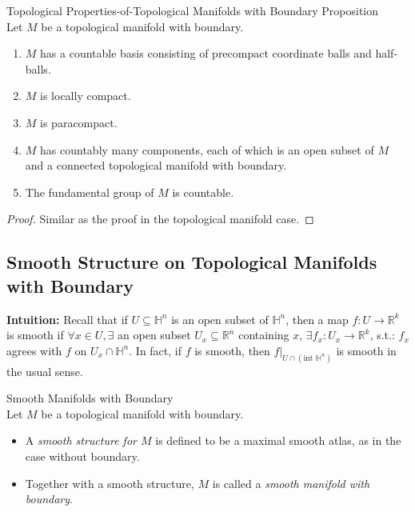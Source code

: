 \begin{proposition}{Topological Properties-of-Topological Manifolds with Boundary Proposition}\\
Let $M$ be a topological manifold with boundary.
\begin{enumerate}
    \item $M$ has a countable basis consisting of precompact coordinate balls and half-balls.
    \item $M$ is locally compact.
    \item $M$ is paracompact.
    \item $M$ has countably many components, each of which is an open subset of $M$ and a connected topological manifold with boundary.
    \item The fundamental group of $M$ is countable.
\end{enumerate}
\end{proposition}

\begin{proof}
    Similar as the proof in the topological manifold case.
\end{proof}

\subsection{Smooth Structure on Topological Manifolds with Boundary}

\noindent\textbf{Intuition:} Recall that if $U \subseteq \mathbb{H}^n$ is an open subset of $\mathbb{H}^n$, then a map $f:U \to \mathbb{R}^k$ is smooth if $\forall x\in U, \exists$ an open subset $U_x \subseteq \mathbb{R}^n$ containing $x$, $\exists f_x :U_x\to \mathbb{R}^k$, s.t.: $f_x$ agrees with $f$ on $U_x \cap \mathbb{H}^n$. In fact, if $f$ is smooth, then $f|_{U \cap (\text{int }\mathbb{H}^n)}$ is smooth in the usual sense.

\begin{definition}{Smooth Manifolds with Boundary}\\
Let $M$ be a topological manifold with boundary. 
\begin{itemize}
    \item A \textit{smooth structure for $M$} is defined to be a maximal smooth atlas, as in the case without boundary.
    \item Together with a smooth structure, $M$ is called a \textit{smooth manifold with boundary}.
\end{itemize}
\end{definition}

